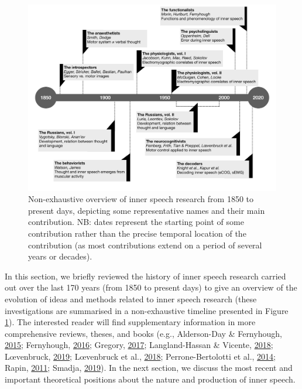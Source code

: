 \documentclass[a4paper,12pt,twoside,openright,oldfontcommands,final]{memoir}
\begin{document}
\begin{landscape}

\begin{figure}

{\centering \includegraphics[width=1\linewidth]{assets/timeline} 

}

\caption{Non-exhaustive overview of inner speech research from 1850 to present days, depicting some representative names and their main contribution. NB: dates represent the starting point of some contribution rather than the precise temporal location of the contribution (as most contributions extend on a period of several years or decades).}\label{fig:timeline}
\end{figure}

\end{landscape}

In this section, we briefly reviewed the history of inner speech research carried out over the last 170 years (from 1850 to present days) to give an overview of the evolution of ideas and methods related to inner speech research (these investigations are summarised in a non-exhaustive timeline presented in Figure \ref{fig:timeline}). The interested reader will find supplementary information in more comprehensive reviews, theses, and books (e.g., Alderson-Day \& Fernyhough, \protect\hyperlink{ref-alderson-day_inner_2015}{2015}; Fernyhough, \protect\hyperlink{ref-fernyhough_voices_2016}{2016}; Gregory, \protect\hyperlink{ref-gregory_inner_2017}{2017}; Langland-Hassan \& Vicente, \protect\hyperlink{ref-langland-hassan_inner_2018}{2018}; Lœvenbruck, \protect\hyperlink{ref-loevenbruck_loquor_2019}{2019}; Lœvenbruck et al., \protect\hyperlink{ref-loevenbruck_cognitive_2018}{2018}; Perrone-Bertolotti et al., \protect\hyperlink{ref-Perrone-Bertolotti2014}{2014}; Rapin, \protect\hyperlink{ref-Rapin2011}{2011}; Smadja, \protect\hyperlink{ref-smadja_parole_2019}{2019}). In the next section, we discuss the most recent and important theoretical positions about the nature and production of inner speech.
\end{document}
